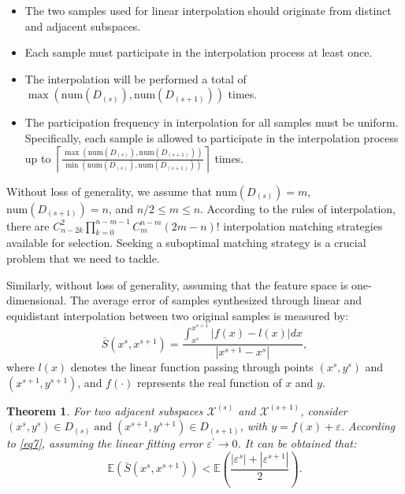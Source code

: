 \documentclass[final,3p,times]{elsarticle}
\newtheorem{theorem}{Theorem}
\begin{document}
\begin{itemize}
  \item The two samples used for linear interpolation should 
  originate from distinct and adjacent subspaces.
  \item Each sample must participate in the interpolation 
  process at least once.
  \item The interpolation will be performed a total of 
  $\max(\text{num}{(D_{(s)}),\text{num}(D_{(s+1)})})$ times.
  \item The participation frequency in interpolation for all 
  samples must be uniform. Specifically, each sample is allowed 
  to participate in the interpolation process up to 
  $\left\lceil \frac{\max(\text{num}{(D_{(s)}),
  \text{num}(D_{(s+1)})})}{\min(\text{num}{(D_{(s)}),
  \text{num}(D_{(s+1)})})}\right\rceil$ times.
\end{itemize}

Without loss of generality, we 
assume that $\text{num}(D_{(s)})=m$, $\text{num}(D_{(s+1)})=n$, 
and $n/2\le m \le n$. According to the rules of interpolation, 
there are $C_{n-2k}^{2}\prod_{k=0}^{n-m-1} C_{m}^{n-m}(2m-n)!$ 
interpolation matching strategies available for selection. 
Seeking a suboptimal matching strategy is a crucial problem 
that we need to tackle.

Similarly, without loss of generality, assuming that the feature 
space is one-dimensional. The average error of samples synthesized 
through linear and equidistant interpolation between two original 
samples is measured by:
\begin{equation} 
\label{eq12}
\bar{S}(x^s,x^{s+1})=\frac{\int_{x^s}^{x^{s+1}}|f(x)-l(x)|  dx}
{|x^{s+1}-x^s|}, 
\end{equation}
where $l(x)$ denotes the linear function passing through points 
$(x^s,y^s)$ and $(x^{s+1},y^{s+1})$, and $f(\cdot)$ represents
 the real function of $x$ and $y$. 

\begin{theorem}
\label{the2}
For two adjacent subspaces $\mathcal{X}^{(s)}$ and $\mathcal{X}^{(s+1)}$, 
consider $(x^s,y^s)\in D_{(s)}\;\text{and}\; (x^{s+1},y^{s+1})
\in D_{(s+1)}$, with $y=f(x)+\varepsilon$. According to \eqref{eq7}, 
assuming the linear fitting error $\varepsilon^\prime\rightarrow0$. 
It can be obtained that:
\begin{equation}
\label{eq13}
\mathbb{E} (\bar{S}(x^s,x^{s+1}))< \mathbb{E}(\frac{|\varepsilon^s|
+|\varepsilon^{s+1}|}{2}).
\end{equation}
\end{theorem}
\end{document}
